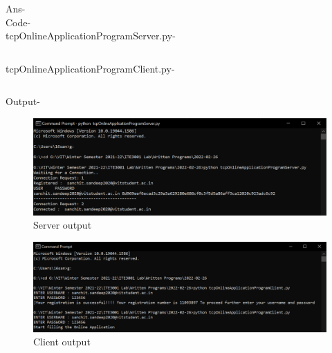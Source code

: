 \documentclass[12pt]{article}
\begin{document}
Ans- \\ Code- \\ tcpOnlineApplicationProgramServer.py-\inputminted{python}{tcpOnlineApplicationProgramServer.py}
tcpOnlineApplicationProgramClient.py- \inputminted{python}{tcpOnlineApplicationProgramClient.py}
\newpage
Output-
\begin{figure}[h] %
\centering
\includegraphics[width=\textwidth]{tcpOnlineApplicationProgramServer.png}
\caption{Server output}
\end{figure}
\begin{figure}[h] %
\centering
\includegraphics[width=\textwidth]{tcpOnlineApplicationProgramClient.png}
\caption{Client output}
\end{figure}
\newpage
\end{document}
